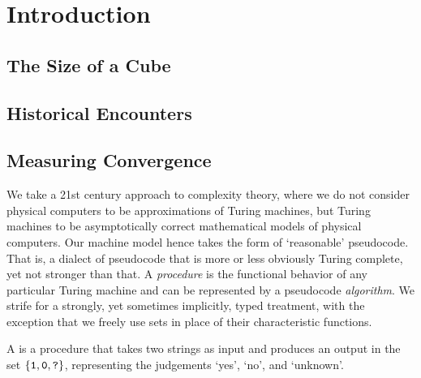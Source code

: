 \chapter{Introduction}



\section{The Size of a Cube}


\section{Historical Encounters}


\section{Measuring Convergence}


We take a 21st century approach to complexity theory, where we do not consider physical computers to be approximations of Turing machines, but Turing machines to be asymptotically correct mathematical models of physical computers.
Our machine model hence takes the form of `reasonable' pseudocode.
That is, a dialect of pseudocode that is more or less obviously Turing complete, yet not stronger than that.
A \emph{procedure} is the functional behavior of any particular Turing machine and can be represented by a pseudocode \emph{algorithm}.
We strife for a strongly, yet sometimes implicitly, typed treatment, with the exception that we freely use sets in place of their characteristic functions.

\begin{definition}
  A  is a procedure that takes two strings as input and produces an output in the set $\{\textnormal{\texttt{1}}, \textnormal{\texttt{0}}, \textnormal{\texttt{?}}\}$, representing the judgements `yes', `no', and `unknown'.
\end{definition}

